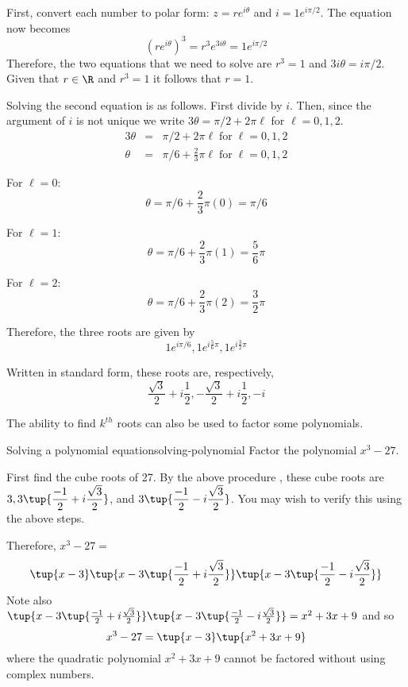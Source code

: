 \begin{solution}
First, convert each number to polar form: $z = re^{i\theta}$ and $i = 1 e^{i \pi/2}$. The equation now becomes
\[
(re^{i\theta})^3 = r^3 e^{3i\theta} = 1 e^{i \pi/2}
\]
Therefore, the two equations that we need to solve are $r^3 = 1$ and $3i\theta = i \pi/2$. Given that $r \in \R$ and $r^3 = 1$ it follows that $r=1$. 

Solving the second equation is as follows. First divide by $i$. Then, since the argument of $i$ is not unique we write $3\theta = \pi/2 + 2\pi\ell$ for $\ell = 0,1,2$. 
\begin{eqnarray*}
3\theta &=& \pi/2 + 2\pi\ell \; \mbox{for} \; \ell = 0,1,2 \\
\theta &=& \pi/6 + \frac{2}{3} \pi\ell \; \mbox{for} \; \ell = 0,1,2 
\end{eqnarray*}

For $\ell = 0$:
\[
\theta = \pi/6 + \frac{2}{3} \pi (0) = \pi/6
\]

For $\ell = 1$:
\[
\theta = \pi/6 + \frac{2}{3} \pi(1) = \frac{5}{6} \pi
\]

For $\ell = 2$:
\[
\theta = \pi/6 + \frac{2}{3} \pi(2) = \frac{3}{2} \pi
\]

Therefore, the three roots are given by \[
1e^{i \pi/6}, 1e^{i \frac{5}{6}\pi}, 1e^{i \frac{3}{2}\pi}
\]

Written in standard form, these roots are, respectively,
\[
\frac{\sqrt{3}}{2} + i \frac{1}{2}, -\frac{\sqrt{3}}{2} + i \frac{1}{2}, -i
\]

\end{solution}

The ability to find $k^{th}$ roots can also be used to factor some
polynomials.

\begin{example}{Solving a polynomial equation}{solving-polynomial}
Factor the polynomial $x^{3}-27$.
\end{example}

\begin{solution}
First find the cube roots of 27. By the above procedure
, these cube roots
are $3,3\tup{\displaystyle
\frac{-1}{2}+i\displaystyle\frac{\sqrt{3}}{2}}$, and $3\tup{
\displaystyle\frac{-1}{2}-i\displaystyle\frac{\sqrt{3}}{2}}$. You may wish to verify 
this using the above steps.

Therefore, $x^{3}-27 =$
\begin{equation*}
 \tup{x-3} \tup{x-3\tup{\frac{-1}{2}+i\frac{\sqrt{3}}{2}}
} \tup{x-3\tup{\frac{-1}{2}-i\frac{\sqrt{3}}{2}} } 
\end{equation*}
Note also $\tup{x-3\tup{\frac{-1}{2}+i\frac{\sqrt{3}}{2}} }
\tup{x-3\tup{\frac{-1}{2}-i\frac{\sqrt{3}}{2}} }
=\allowbreak x^{2}+3x+9$ and so
\begin{equation*}
x^{3}-27=\tup{x-3} \tup{x^{2}+3x+9}
\end{equation*}
where the quadratic polynomial $x^{2}+3x+9$ cannot be factored without using
complex numbers.
\end{solution}

